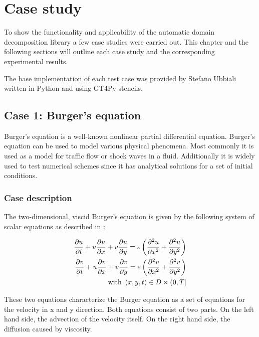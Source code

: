 \section{Case study}

To show the functionality and applicability of the automatic domain decomposition library a few case studies were carried out.
This chapter and the following sections will outline each case study and the corresponding experimental results.

The base implementation of each test case was provided by Stefano Ubbiali written in Python and using GT4Py stencils.

\subsection{Case 1: Burger's equation}
Burger's equation is a well-known nonlinear partial differential equation.
Burger's equation can be used to model various physical phenomena.
Most commonly it is used as a model for traffic flow or shock waves in a fluid.
Additionally it is widely used to test numerical schemes since it has analytical solutions for a set of initial conditions.

\subsubsection{Case description}
\label{sec:case_description}

The two-dimensional, viscid Burger's equation is given by the following system of scalar equations as described in \citet{zhao2011new}:

\begin{equation}
\begin{split}
\frac{\partial u}{\partial t} + u \frac{\partial u}{\partial x} + v \frac{\partial u}{\partial y} = \varepsilon \left( \frac{\partial ^2 u}{\partial x^2} + \frac{\partial ^2 u}{\partial y^2} \right) \\
\frac{\partial v}{\partial t} + u \frac{\partial v}{\partial x} + v \frac{\partial v}{\partial y} = \varepsilon \left( \frac{\partial ^2 v}{\partial x^2} + \frac{\partial ^2 v}{\partial y^2} \right) \\
\text{with } \left(x, y, t\right) \in D \times \left(0,T\right]
\end{split}
\end{equation}

These two equations characterize the Burger equation as a set of equations for the velocity in x and y direction.
Both equations consist of two parts.
On the left hand side, the advection of the velocity itself.
On the right hand side, the diffusion caused by viscosity.

